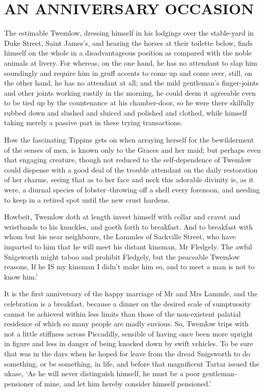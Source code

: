 
\chapter{AN ANNIVERSARY OCCASION}

The estimable Twemlow, dressing himself in his lodgings over the
stable-yard in Duke Street, Saint James’s, and hearing the horses at
their toilette below, finds himself on the whole in a disadvantageous
position as compared with the noble animals at livery. For whereas, on
the one hand, he has no attendant to slap him soundingly and require him
in gruff accents to come up and come over, still, on the other hand,
he has no attendant at all; and the mild gentleman’s finger-joints and
other joints working rustily in the morning, he could deem it agreeable
even to be tied up by the countenance at his chamber-door, so he were
there skilfully rubbed down and slushed and sluiced and polished and
clothed, while himself taking merely a passive part in these trying
transactions.

How the fascinating Tippins gets on when arraying herself for the
bewilderment of the senses of men, is known only to the Graces and her
maid; but perhaps even that engaging creature, though not reduced to
the self-dependence of Twemlow could dispense with a good deal of the
trouble attendant on the daily restoration of her charms, seeing that
as to her face and neck this adorable divinity is, as it were, a diurnal
species of lobster--throwing off a shell every forenoon, and needing to
keep in a retired spot until the new crust hardens.

Howbeit, Twemlow doth at length invest himself with collar and cravat
and wristbands to his knuckles, and goeth forth to breakfast. And to
breakfast with whom but his near neighbours, the Lammles of Sackville
Street, who have imparted to him that he will meet his distant kinsman,
Mr Fledgely. The awful Snigsworth might taboo and prohibit Fledgely, but
the peaceable Twemlow reasons, If he IS my kinsman I didn’t make him so,
and to meet a man is not to know him.’

It is the first anniversary of the happy marriage of Mr and Mrs Lammle,
and the celebration is a breakfast, because a dinner on the desired
scale of sumptuosity cannot be achieved within less limits than those
of the non-existent palatial residence of which so many people are
madly envious. So, Twemlow trips with not a little stiffness across
Piccadilly, sensible of having once been more upright in figure and less
in danger of being knocked down by swift vehicles. To be sure that was
in the days when he hoped for leave from the dread Snigsworth to do
something, or be something, in life, and before that magnificent Tartar
issued the ukase, ‘As he will never distinguish himself, he must be a
poor gentleman-pensioner of mine, and let him hereby consider himself
pensioned.’

